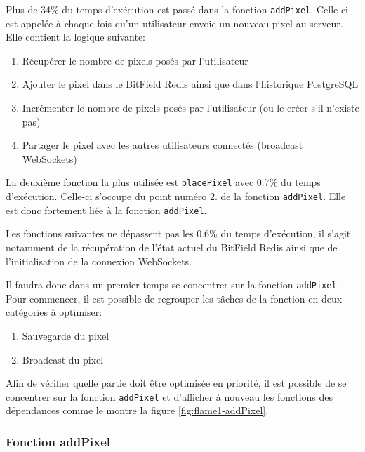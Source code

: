 Plus de 34\% du temps d'exécution est passé dans la fonction \texttt{addPixel}. Celle-ci est appelée à chaque fois qu'un utilisateur envoie un nouveau pixel au serveur. Elle contient la logique suivante:

\begin{enumerate}
  \item Récupérer le nombre de pixels posés par l'utilisateur
  \item Ajouter le pixel dans le BitField Redis ainsi que dans l'historique PostgreSQL
  \item Incrémenter le nombre de pixels posés par l'utilisateur (ou le créer s'il n'existe pas)
  \item Partager le pixel avec les autres utilisateurs connectés (broadcast WebSockets)
\end{enumerate}

La deuxième fonction la plus utilisée est \texttt{placePixel} avec 0.7\% du temps d'exécution. Celle-ci s'occupe du point numéro 2. de la fonction \texttt{addPixel}. Elle est donc fortement liée à la fonction \texttt{addPixel}.

Les fonctions suivantes ne dépassent pas les 0.6\% du temps d'exécution, il s'agit notamment de la récupération de l'état actuel du BitField Redis ainsi que de l'initialisation de la connexion WebSockets.

Il faudra donc dans un premier temps se concentrer sur la fonction \texttt{addPixel}. Pour commencer, il est possible de regrouper les tâches de la fonction en deux catégories à optimiser:

\begin{enumerate}
  \item Sauvegarde du pixel
  \item Broadcast du pixel
\end{enumerate}

Afin de vérifier quelle partie doit être optimisée en priorité, il est possible de se concentrer sur la fonction \texttt{addPixel} et d'afficher à nouveau les fonctions des dépendances comme le montre la figure \ref{fig:flame1-addPixel}.

\subsubsection{Fonction addPixel}

